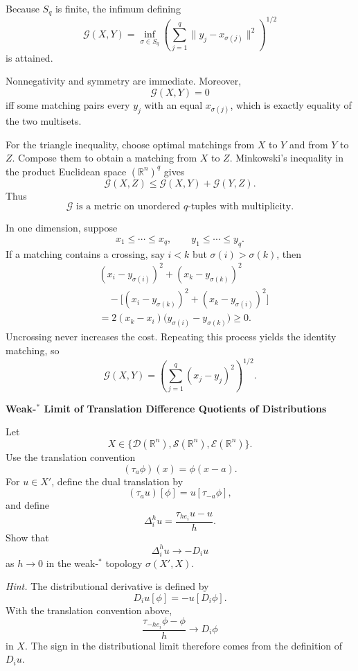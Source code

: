 \begin{solution}
Because \(S_q\) is finite, the infimum defining
\[
\mathcal G(X,Y)
=
\inf_{\sigma\in S_q}
\left(
\sum_{j=1}^q
\|y_j-x_{\sigma(j)}\|^2
\right)^{1/2}
\]
is attained.

Nonnegativity and symmetry are immediate. Moreover,
\[
\mathcal G(X,Y)=0
\]
iff some matching pairs every \(y_j\) with an equal \(x_{\sigma(j)}\), which is exactly
equality of the two multisets.

For the triangle inequality, choose optimal matchings from \(X\) to \(Y\) and from \(Y\) to
\(Z\). Compose them to obtain a matching from \(X\) to \(Z\). Minkowski's inequality in the
product Euclidean space \((\mathbb R^n)^q\) gives
\[
\mathcal G(X,Z)
\le
\mathcal G(X,Y)+\mathcal G(Y,Z).
\]
Thus
\[
\boxed{\mathcal G\text{ is a metric on unordered \(q\)-tuples with multiplicity}.}
\]

In one dimension, suppose
\[
x_1\le\cdots\le x_q,
\qquad
y_1\le\cdots\le y_q.
\]
If a matching contains a crossing, say \(i<k\) but \(\sigma(i)>\sigma(k)\), then
\[
\begin{aligned}
&(x_i-y_{\sigma(i)})^2+(x_k-y_{\sigma(k)})^2\\
&\quad-
\bigl[
(x_i-y_{\sigma(k)})^2
+
(x_k-y_{\sigma(i)})^2
\bigr]\\
&=
2(x_k-x_i)
\bigl(
y_{\sigma(i)}-y_{\sigma(k)}
\bigr)
\ge0.
\end{aligned}
\]
Uncrossing never increases the cost. Repeating this process yields the identity matching, so
\[
\boxed{
\mathcal G(X,Y)
=
\left(
\sum_{j=1}^q(x_j-y_j)^2
\right)^{1/2}.
}
\]
\end{solution}


\begin{problem}[CP-II-0315]
\label{prob:cp-ii-0315}
\textbf{Weak-\(^*\) Limit of Translation Difference Quotients of Distributions}

\hspace*{1.5em}Let
\[
X\in
\{
\mathcal D(\mathbb R^n),
\mathcal S(\mathbb R^n),
\mathcal E(\mathbb R^n)
\}.
\]
Use the translation convention
\[
(\tau_a\phi)(x)
=
\phi(x-a).
\]
For \(u\in X'\), define the dual translation by
\[
(\tau_a u)[\phi]
=
u[\tau_{-a}\phi],
\]
and define
\[
\Delta_i^h u
=
\frac{\tau_{he_i}u-u}{h}.
\]
Show that
\[
\boxed{
\Delta_i^h u
\longrightarrow
-D_i u
}
\]
as \(h\to0\) in the weak-\(^*\) topology
\(\sigma(X',X)\).

\medskip
\noindent\emph{Hint.} The distributional derivative is defined by
\[
D_i u[\phi]
=
-u[D_i\phi].
\]
With the translation convention above,
\[
\frac{\tau_{-he_i}\phi-\phi}{h}
\longrightarrow
D_i\phi
\]
in \(X\). The sign in the distributional limit therefore comes from the
definition of \(D_i u\).
\end{problem}

